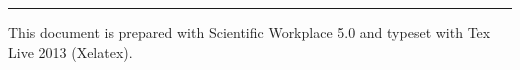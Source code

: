 \documentclass[12pt,twoside]{article}
\begin{document}
\bigskip

\null
\vfill

\begin{center}
\rule{6in}{0.01in}
\end{center}

\noindent This document is prepared with Scientific Workplace 5.0 and
typeset with Tex Live 2013 (Xelatex).

\noindent\href{http://whymranderson.blogspot.tw/2014/03/how-to-convert-swp-50-special-unicode.html%
}{\underline{\color{blue}}}

\noindent\href{https://drive.google.com/file/d/0B96HmLH-SQVmM1dvYlFiQm9ESGM/edit?usp=sharing%
}{\underline{\color{blue}%
%
}}

\bigskip

%
\end{document}

